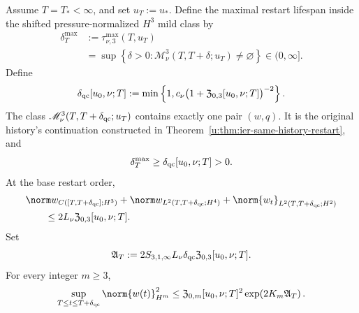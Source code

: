 \begin{theorem}
\label{u:thm:qc-restart}
Assume \(T=T_*<\infty\), and set \(u_T:=u_*\).
Define the maximal restart lifespan inside the shifted pressure-normalized
\(H^3\) mild class by
\begin{equation}
 \begin{aligned}
 \delta_T^{\max}
 &:=\tau_{\nu,3}^{\max}(T,u_T)\\
 &=\sup\left\{\delta>0:
 \mathscr M_\nu^3(T,T+\delta;u_T)\ne\varnothing\right\}
 \in(0,\infty].
 \end{aligned}
 \label{u:eq:qc-maximal-restart-lifespan-definition}
\end{equation}
Define
\begin{equation}
 \delta_{\rm qc}[u_0,\nu;T]
 :=\min\left\{
 1,
 c_\nu\bigl(1+\mathfrak Z_{0,3}[u_0,\nu;T]\bigr)^{-2}
 \right\}.
 \label{u:eq:qc-restart-lifespan}
\end{equation}
The class \(\mathscr M_\nu^3(T,T+\delta_{\rm qc};u_T)\) contains exactly one
pair \((w,q)\).  It is the original history's continuation constructed in
Theorem~\ref{u:thm:ier-same-history-restart}, and
\begin{equation}
 \delta_T^{\max}\ge\delta_{\rm qc}[u_0,\nu;T]>0.
 \label{u:eq:qc-restart-lower-bound}
\end{equation}
At the base restart order,
\begin{align}
 &\norm w_{C([T,T+\delta_{\rm qc}];H^3)}
 +\norm w_{L^2(T,T+\delta_{\rm qc};H^4)}
 +\norm{w_t}_{L^2(T,T+\delta_{\rm qc};H^2)}
 \notag\\
 &\qquad\le2L_\nu\mathfrak Z_{0,3}[u_0,\nu;T].
 \label{u:eq:qc-restart-base-size}
\end{align}
Set
\begin{equation}
 \mathfrak A_T
 :=2S_{3,1,\infty}L_\nu\delta_{\rm qc}
 \mathfrak Z_{0,3}[u_0,\nu;T].
 \label{u:eq:qc-restart-action}
\end{equation}
For every integer \(m\ge3\),
\begin{equation}
 \sup_{T\le t\le T+\delta_{\rm qc}}\norm{w(t)}_{H^m}^2
 \le\mathfrak Z_{0,m}[u_0,\nu;T]^2
 \exp\!\left(2K_m\mathfrak A_T\right).
 \label{u:eq:qc-restart-persistence-size}
\end{equation}
\end{theorem}

